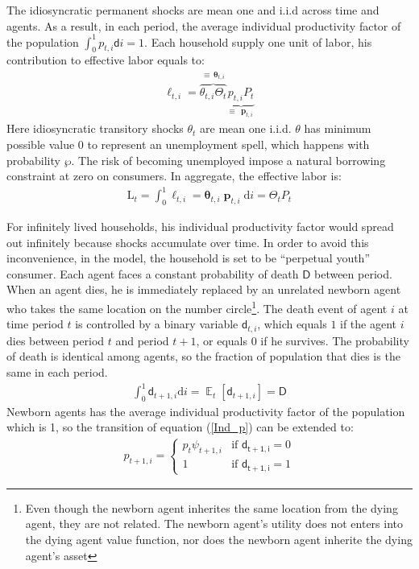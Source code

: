 \documentclass[12pt,letterpaper]{article}
\DeclareMathOperator{\E}{\mathbb{E}}
\DeclareMathOperator{\pLev}{\pmb{p}}
\begin{document}
The idiosyncratic permanent shocks are mean one and i.i.d across time and agents. As a result, in each period, the average individual productivity factor of the population $\int_{0}^{1}p_{t,i}\mathsf{d}i=1$. Each household supply one unit of labor, his contribution to effective labor equals to:
\begin{eqnarray}
\pmb{\ell}_{t,i}= \overbrace{\theta_{t,i}\Theta_{t}}^{\equiv\,\pmb{\theta}_{t,i}}\underbrace{{p}_{t,i} {P}_{t}}_{\equiv\,\pLev_{t,i}}
\end{eqnarray}
Here idiosyncratic transitory shocks $\theta_{t}$ are mean one i.i.d. $\theta$ has minimum possible value 0 to represent an unemployment spell, which happens with probability $\wp$. The risk of becoming unemployed impose a natural borrowing constraint at zero on consumers. In aggregate, the effective labor is:
\begin{eqnarray}
\pmb{\mathrm{L}}_{t}=\int_{0}^{1}\pmb{\ell}_{t,i}=\pmb{\theta}_{t,i}\pLev_{t,i}\text{d}i=\Theta_{t}P_{t}
\end{eqnarray}
\par
For infinitely lived households, his individual productivity factor would spread out infinitely because shocks accumulate over time. In order to avoid this inconvenience, in the model, the household is set to be \cite{blanchardFinite} ``perpetual youth'' consumer. Each agent faces a constant probability of death $\mathsf{D}$ between period. When an agent dies, he is immediately replaced by an unrelated newborn agent who takes the same location on the number circle\footnote{Even though the newborn agent inherites the same location from the dying agent, they are not related. The newborn agent's utility does not enters into the dying agent value function, nor does the newborn agent inherite the dying agent's asset}. The death event of agent $i$ at time period $t$ is controlled by a binary variable $\mathsf{d}_{t,i}$, which equals $1$ if the agent $i$ dies between period $t$ and period $t+1$, or equals $0$ if he survives. The probability of death is identical among agents, so the fraction of population that dies is the same in each period.
\begin{eqnarray}
\int_{0}^{1}\mathsf{d}_{t+1,i}\text{d}i=\E_{t}\left[\mathsf{d}_{t+1,i}\right]= \mathsf{D}
\end{eqnarray}
Newborn agents has the average individual productivity factor of the population which is 1, so the transition of equation (\ref{Ind_p}) can be extended to:
\begin{eqnarray}
p_{t+1,i}=
\begin{cases}
p_{t}\psi_{t+1,i}  & \text{if }\mathsf{d_{t+1,i}}=0\\
1 & \text{if }\mathsf{d_{t+1,i}}=1
\end{cases}
\end{eqnarray}
\end{document}

